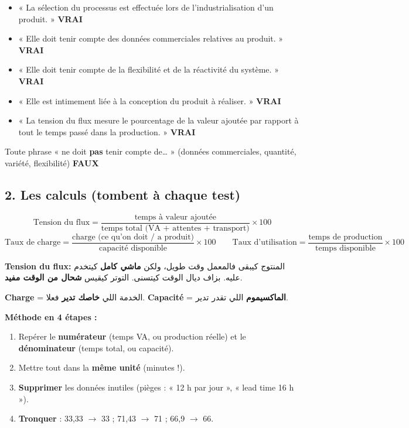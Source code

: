 \documentclass[11pt,a4paper]{article}
\newcommand{\fr}[1]{\textfrench{#1}}
\newcommand{\vrai}{\textcolor{vert}{\textbf{VRAI}}}
\newcommand{\faux}{\textcolor{rouge}{\textbf{FAUX}}}
\begin{document}
\begin{examen}
\begin{itemize}
\item « La sélection du processus est effectuée lors de l'industrialisation d'un produit. » \vrai
\item « Elle doit tenir compte des données commerciales relatives au produit. » \vrai
\item « Elle doit tenir compte de la flexibilité et de la réactivité du système. » \vrai
\item « Elle est intimement liée à la conception du produit à réaliser. » \vrai
\item « La tension du flux mesure le pourcentage de la valeur ajoutée par rapport à tout le temps passé dans la production. » \vrai
\end{itemize}
\end{examen}
\begin{piege}
Toute phrase « ne doit \textbf{pas} tenir compte de\ldots{} » (données commerciales, quantité, variété, flexibilité) \faux
\end{piege}

\subsection*{2. Les calculs \quad (tombent à chaque test)}

\begin{tcolorbox}[colback=white,colframe=bleu,title=Formulaire,fonttitle=\bfseries]
\[
\text{Tension du flux} = \frac{\text{temps à valeur ajoutée}}{\text{temps total (VA + attentes + transport)}} \times 100
\]
\[
\text{Taux de charge} = \frac{\text{charge (ce qu'on doit / a produit)}}{\text{capacité disponible}} \times 100
\qquad
\text{Taux d'utilisation} = \frac{\text{temps de production}}{\text{temps disponible}} \times 100
\]
\end{tcolorbox}

\par\begin{Arabic}
\textbf{\fr{Tension du flux}:} المنتوج كيبقى فالمعمل وقت طويل، ولكن \textbf{ماشي كامل} كيتخدم عليه. بزاف ديال الوقت كيتسنى. التوتر كيقيس \textbf{شحال من الوقت مفيد}.

\textbf{\fr{Charge}} = الخدمة اللي \textbf{خاصك تدير} فعلا. \quad \textbf{\fr{Capacité}} = \textbf{الماكسيموم} اللي تقدر تدير.
\end{Arabic}

\begin{note}
\textbf{Méthode en 4 étapes :}
\begin{enumerate}
\item Repérer le \textbf{numérateur} (temps VA, ou production réelle) et le \textbf{dénominateur} (temps total, ou capacité).
\item Mettre tout dans la \textbf{même unité} (minutes !).
\item \textbf{Supprimer} les données inutiles (pièges : « 12 h par jour », « lead time 16 h »).
\item \textbf{Tronquer} : 33,33 $\rightarrow$ 33 ; 71,43 $\rightarrow$ 71 ; 66,9 $\rightarrow$ 66.
\end{enumerate}
\end{note}
\end{document}
